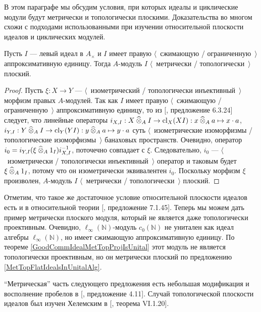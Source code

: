 В этом параграфе мы обсудим условия, при которых идеалы и циклические модули будут метрически и топологически плоскими. Доказательства во многом схожи с подходами использованными при изучении относительной плоскости идеалов и циклических модулей.

\begin{proposition}\label{MetTopFlatIdealsInUnitalAlg} Пусть $I$ --- левый идеал в $A_\times $ и $I$ имеет правую $\langle$~сжимающую / ограниченную~$\rangle$ аппроксимативную единицу. Тогда $A$-модуль $I$ $\langle$~метрически / топологически~$\rangle$ плоский.
\end{proposition}
\begin{proof} Пусть $\xi:X\to Y$ --- $\langle$~изометрический / топологически инъективный~$\rangle$ морфизм правых $A$-модулей. Так как $I$ имеет правую $\langle$~сжимающую / ограниченную~$\rangle$ аппроксимативную единицу, то из [\cite{HelBanLocConvAlg}, предложение 6.3.24] следует, что линейные операторы $i_{X,I}:X\mathbin{\widehat{\otimes}}_{A} I\to \operatorname{cl}_X(XI):x\mathbin{\widehat{\otimes}}_{A} a\mapsto x\cdot a$, $i_{Y,I}:Y\mathbin{\widehat{\otimes}}_{A} I\to \operatorname{cl}_Y(YI):y\mathbin{\widehat{\otimes}}_{A} a\mapsto y\cdot a$ суть $\langle$~изометрические изоморфизмы / топологические изоморфизмы~$\rangle$ банаховых пространств. Очевидно, оператор $i_0=i_{Y,I}(\xi\mathbin{\widehat{\otimes}}_{A} 1_I)i_{X,I}^{-1}$, поточечно совпадает с $\xi$. Следовательно, $i_0$ --- $\langle$~изометрически / топологически инъективный~$\rangle$ оператор и таковым будет $\xi\mathbin{\widehat{\otimes}}_{A} 1_I$, потому что он изометрически эквивалентен $i_0$. Поскольку морфизм $\xi$ произволен, $A$-модуль $I$ $\langle$~метрически / топологически~$\rangle$ плоский. 
\end{proof}

Отметим, что такое же достаточное условие относительной плоскости идеалов есть и в относительной теории [\cite{HelBanLocConvAlg}, предложение 7.1.45]. Теперь мы можем дать пример метрически плоского модуля, который не является даже топологически проективным. Очевидно, $\ell_\infty(\mathbb{N})$-модуль $c_0(\mathbb{N})$ не унитален как идеал алгебры $\ell_\infty(\mathbb{N})$, но имеет сжимающую аппроксимативную единицу. По теореме \ref{GoodCommIdealMetTopProjIsUnital} этот модуль не является топологически проективным, но он метрически плоский по предложению \ref{MetTopFlatIdealsInUnitalAlg}.

``Метрическая'' часть следующего предложения есть небольшая модификация и восполнение пробелов в [\cite{WhiteInjmoduAlg}, предложение 4.11]. Случай топологической плоскости идеалов был изучен Хелемским в [\cite{HelHomolBanTopAlg}, теорема VI.1.20].


